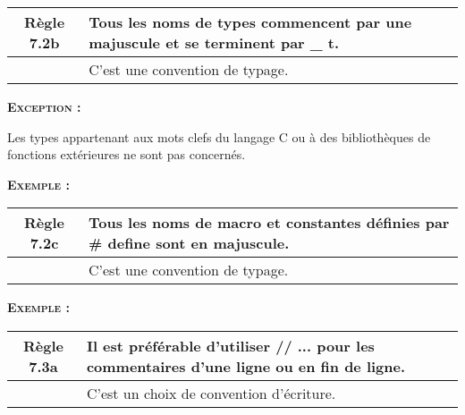 \begin{center}
\begin{tabular}{|c p{12.3cm}|}
\hline
\rowcolor{red!10}\textbf{Règle 7.2b} & Tous les noms de types commencent par une majuscule et se terminent par \_ t.\\ \hline
 & C’est une convention de typage.\\ \hline
\hline
\end{tabular}
\end{center}

\smallskip
\begin{large}
\textbf{\textsc{Exception :}}
\end{large}
Les types appartenant aux mots clefs du langage C ou à des bibliothèques de fonctions extérieures ne sont pas concernés.

\smallskip
\begin{large}
\textbf{\textsc{Exemple :}}
\end{large}


\medskip

\begin{center}
\begin{tabular}{|c p{12.3cm}|}
\hline
\rowcolor{red!10}\textbf{Règle 7.2c} & Tous les noms de macro et constantes définies par \# define sont en majuscule.\\ \hline
 & C’est une convention de typage.\\ \hline
\hline
\end{tabular}
\end{center}

\smallskip
\begin{large}
\textbf{\textsc{Exemple :}}
\end{large}


\medskip

\begin{center}
\begin{tabular}{|c p{12.3cm}|}
\hline
\rowcolor{red!10}\textbf{Règle 7.3a} & Il est préférable d’utiliser // ... pour les commentaires d’une ligne ou en fin de ligne.\\ \hline
 & C’est un choix de convention d’écriture.\\ \hline
\hline
\end{tabular}
\end{center}

